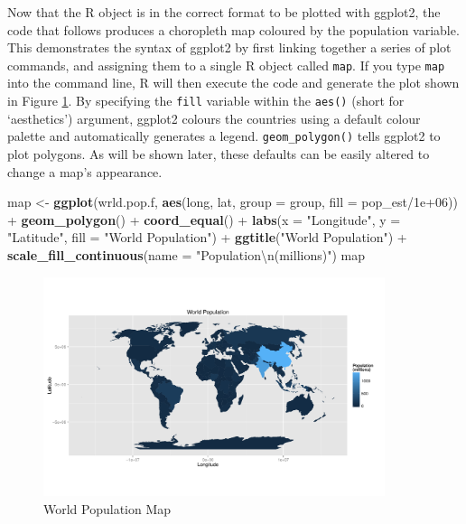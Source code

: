 \documentclass[]{article}
\newenvironment{Shaded}{}{}
\newcommand{\KeywordTok}[1]{\textcolor[rgb]{0.00,0.44,0.13}{\textbf{{#1}}}}
\newcommand{\DataTypeTok}[1]{\textcolor[rgb]{0.56,0.13,0.00}{{#1}}}
\newcommand{\FloatTok}[1]{\textcolor[rgb]{0.25,0.63,0.44}{{#1}}}
\newcommand{\CharTok}[1]{\textcolor[rgb]{0.25,0.44,0.63}{{#1}}}
\newcommand{\StringTok}[1]{\textcolor[rgb]{0.25,0.44,0.63}{{#1}}}
\newcommand{\NormalTok}[1]{{#1}}
\let\Oldincludegraphics\includegraphics
\renewcommand{\includegraphics}[1]{\Oldincludegraphics[width=10cm]{#1}}
\begin{document}
Now that the R object is in the correct format to be plotted with ggplot2, the code that follows
 produces a choropleth map coloured by the population variable. This
demonstrates the syntax of ggplot2 by first linking together a series
of plot commands, and assigning them to a single R object called
\texttt{map}. If you type \texttt{map} into the command line, R will
then execute the code and generate the plot shown in Figure \ref{fworldpop}. By specifying the
\texttt{fill} variable within the \texttt{aes()} (short for
`aesthetics') argument, ggplot2 colours the countries using a default
colour palette and automatically generates a legend.
\texttt{geom\_polygon()} tells ggplot2 to plot polygons. As will be
shown later, these defaults can be easily altered to change
a map's appearance.

\begin{Shaded}
\begin{Highlighting}[]
\NormalTok{map <-}\StringTok{ }\KeywordTok{ggplot}\NormalTok{(wrld.pop.f, }\KeywordTok{aes}\NormalTok{(long, lat, }\DataTypeTok{group =} \NormalTok{group, }\DataTypeTok{fill =} \NormalTok{pop_est/}\FloatTok{1e+06}\NormalTok{)) +}\StringTok{ }
\StringTok{    }\KeywordTok{geom_polygon}\NormalTok{() +}\StringTok{ }\KeywordTok{coord_equal}\NormalTok{() +}\StringTok{ }\KeywordTok{labs}\NormalTok{(}\DataTypeTok{x =} \StringTok{"Longitude"}\NormalTok{, }\DataTypeTok{y =} \StringTok{"Latitude"}\NormalTok{, }\DataTypeTok{fill =} \StringTok{"World Population"}\NormalTok{) +}\StringTok{ }
\StringTok{    }\KeywordTok{ggtitle}\NormalTok{(}\StringTok{"World Population"}\NormalTok{) +}\StringTok{ }\KeywordTok{scale_fill_continuous}\NormalTok{(}\DataTypeTok{name =} \StringTok{"Population}\CharTok{\textbackslash{}n}\StringTok{(millions)"}\NormalTok{)}
\NormalTok{map}
\end{Highlighting}
\end{Shaded}

\begin{figure}[htbp]
\centering
\includegraphics{figs/World_Population_Map}
\caption{World Population Map} \label{fworldpop}
\end{figure}
\end{document}
